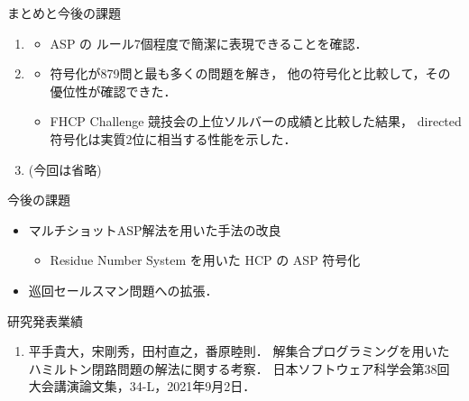 \documentclass[dvipdfmx]{beamer}
\begin{document}
\begin{frame}{まとめと今後の課題}

\begin{enumerate}
\item {}
  \begin{itemize}
  \item ASP の \alert{ルール7個}程度で簡潔に表現できることを確認．
  \end{itemize}
\item {}
  \begin{itemize}
  \item {} 符号化が879問と最も多くの問題を解き，
    他の符号化と比較して，その優位性が確認できた．
  \item FHCP Challenge 競技会の上位ソルバーの成績と比較した結果，
    directed 符号化は\alert{実質2位}に相当する性能を示した．
  \end{itemize}
\item {} (今回は省略)
\end{enumerate}

\begin{block}{今後の課題}
  \begin{itemize}
  \item マルチショットASP解法を用いた手法の改良
    \begin{itemize}
    \item Residue Number System を用いた
      HCP の ASP 符号化
    \end{itemize}
  \item 巡回セールスマン問題への拡張．
  \end{itemize}
\end{block}
\end{frame}

\begin{frame}{研究発表業績}
  \begin{enumerate}
  \item 平手貴大，宋剛秀，田村直之，番原睦則．
    解集合プログラミングを用いたハミルトン閉路問題の解法に関する考察．
    日本ソフトウェア科学会第38回大会講演論文集，34-L，2021年9月2日．
  \end{enumerate}
\end{frame}
\end{document}
